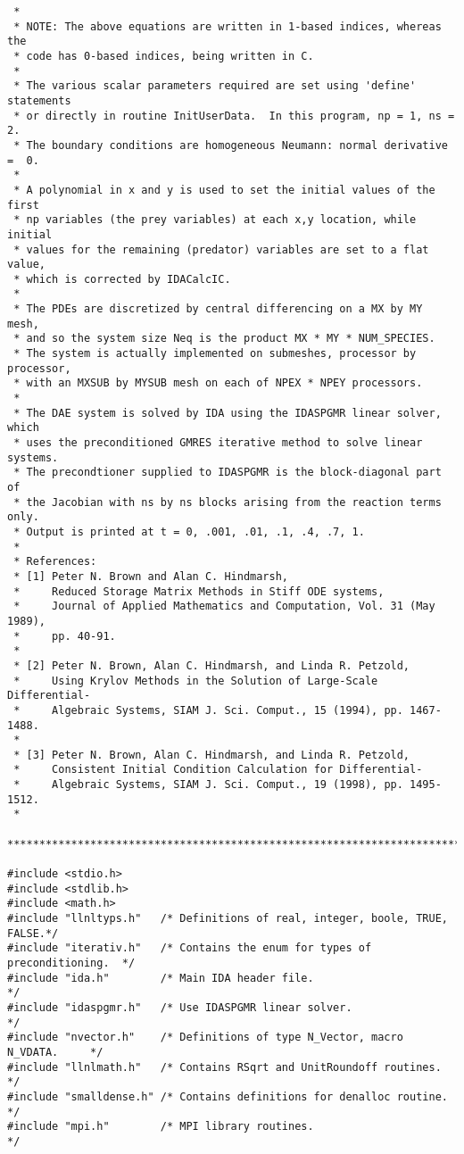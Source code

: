 \begin{verbatim}
 *  
 * NOTE: The above equations are written in 1-based indices, whereas the
 * code has 0-based indices, being written in C.
 *
 * The various scalar parameters required are set using 'define' statements 
 * or directly in routine InitUserData.  In this program, np = 1, ns = 2.
 * The boundary conditions are homogeneous Neumann: normal derivative  =  0.
 *
 * A polynomial in x and y is used to set the initial values of the first
 * np variables (the prey variables) at each x,y location, while initial
 * values for the remaining (predator) variables are set to a flat value,
 * which is corrected by IDACalcIC.
 *
 * The PDEs are discretized by central differencing on a MX by MY mesh,
 * and so the system size Neq is the product MX * MY * NUM_SPECIES.
 * The system is actually implemented on submeshes, processor by processor,
 * with an MXSUB by MYSUB mesh on each of NPEX * NPEY processors.
 * 
 * The DAE system is solved by IDA using the IDASPGMR linear solver, which
 * uses the preconditioned GMRES iterative method to solve linear systems.
 * The precondtioner supplied to IDASPGMR is the block-diagonal part of
 * the Jacobian with ns by ns blocks arising from the reaction terms only.
 * Output is printed at t = 0, .001, .01, .1, .4, .7, 1.
 *
 * References:
 * [1] Peter N. Brown and Alan C. Hindmarsh,
 *     Reduced Storage Matrix Methods in Stiff ODE systems,
 *     Journal of Applied Mathematics and Computation, Vol. 31 (May 1989),
 *     pp. 40-91.
 *
 * [2] Peter N. Brown, Alan C. Hindmarsh, and Linda R. Petzold,
 *     Using Krylov Methods in the Solution of Large-Scale Differential-
 *     Algebraic Systems, SIAM J. Sci. Comput., 15 (1994), pp. 1467-1488.
 * 
 * [3] Peter N. Brown, Alan C. Hindmarsh, and Linda R. Petzold,
 *     Consistent Initial Condition Calculation for Differential-
 *     Algebraic Systems, SIAM J. Sci. Comput., 19 (1998), pp. 1495-1512.
 * 
 ************************************************************************/

#include <stdio.h>
#include <stdlib.h>
#include <math.h>
#include "llnltyps.h"   /* Definitions of real, integer, boole, TRUE, FALSE.*/
#include "iterativ.h"   /* Contains the enum for types of preconditioning.  */
#include "ida.h"        /* Main IDA header file.                            */
#include "idaspgmr.h"   /* Use IDASPGMR linear solver.                      */
#include "nvector.h"    /* Definitions of type N_Vector, macro N_VDATA.     */
#include "llnlmath.h"   /* Contains RSqrt and UnitRoundoff routines.        */
#include "smalldense.h" /* Contains definitions for denalloc routine.       */
#include "mpi.h"        /* MPI library routines.                            */


\end{verbatim}

